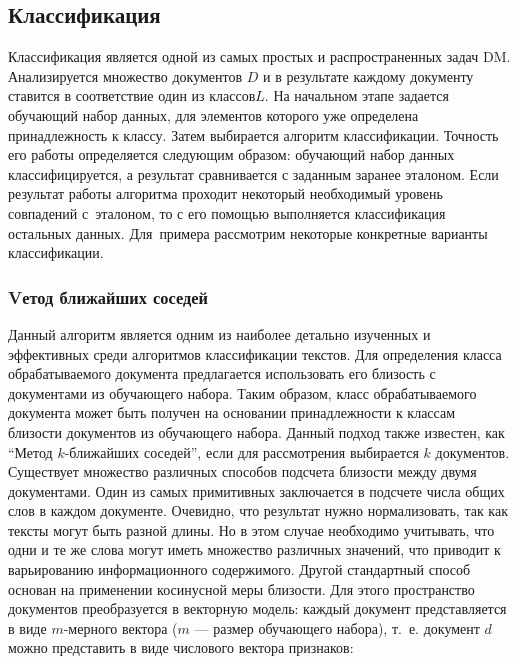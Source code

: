 \subsection{Классификация}

Классификация является одной из самых простых и распространенных задач DM. 
Анализируется множество документов $D$ и в результате каждому документу
ставится в соответствие один из классов$L$.  На начальном этапе
задается обучающий набор данных, для элементов которого уже
определена принадлежность к классу. 
Затем выбирается алгоритм классификации. 
Точность его работы определяется следующим образом:
обучающий набор данных классифицируется, а результат сравнивается с заданным заранее эталоном.
Если результат работы алгоритма проходит некоторый необходимый уровень совпадений с~эталоном, 
то с его помощью выполняется классификация остальных данных.  
Для~примера рассмотрим некоторые конкретные варианты классификации.

\subsubsection{Vетод ближайших соседей}

Данный алгоритм является одним из наиболее детально изученных и эффективных среди
алгоритмов классификации текстов.
Для определения класса обрабатываемого документа предлагается использовать 
его близость с документами из обучающего набора. Таким образом, класс обрабатываемого
документа может быть получен на основании принадлежности к классам близости документов
из обучающего набора. 
Данный подход также известен, как ``Метод $k$-ближайших соседей'', 
если для рассмотрения выбирается $k$ документов.
Существует множество различных способов подсчета близости между двумя документами.
Один из самых примитивных заключается в подсчете числа общих слов в каждом документе.
Очевидно, что результат нужно нормализовать, так как тексты могут быть разной длины.
Но в этом случае необходимо учитывать, что одни и те же слова могут иметь множество
различных значений, что приводит к варьированию информационного содержимого.
Другой стандартный способ основан на применении косинусной меры близости. Для этого пространство 
документов преобразуется в векторную модель: каждый документ представляется в виде
$m$-мерного вектора 
($m$ --- размер обучающего набора), %
т.~е. документ $d$ можно представить
 в виде числового вектора признаков: 

